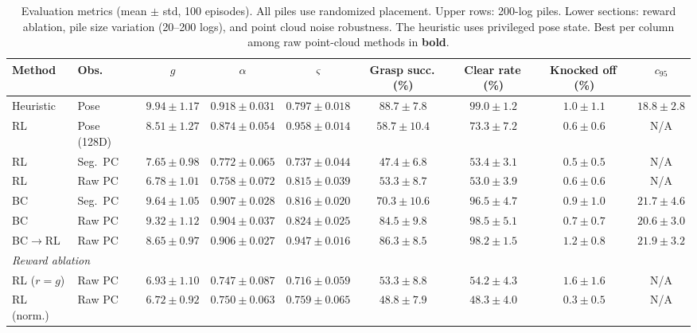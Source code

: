 \documentclass[letterpaper, 10 pt, conference]{ieeeconf}
\begin{document}
\begin{table}[!t]
\centering
\caption{Evaluation metrics (mean $\pm$ std, 100 episodes). All piles use randomized placement. Upper rows: 200-log piles. Lower sections: reward ablation, pile size variation (20--200 logs), and point cloud noise robustness. The heuristic uses privileged pose state. Best per column among raw point-cloud methods in \textbf{bold}.}
\label{tab:results}
\scriptsize
\setlength{\tabcolsep}{3pt}
\setlength{\aboverulesep}{0.2ex}
\setlength{\belowrulesep}{0.4ex}
\renewcommand{\arraystretch}{0.85}
\begin{tabular*}{\textwidth}{@{\extracolsep{\fill}}llccccccc@{}}
\toprule
Method & Obs. & $g$ & $\alpha$ & $\varsigma$ & Grasp succ.\,(\%) & Clear rate\,(\%) & Knocked off\,(\%) & $c_{95}$ \\
\midrule
Heuristic & Pose & $9.94 \pm 1.17$ & $0.918 \pm 0.031$ & $0.797 \pm 0.018$ & $88.7 \pm 7.8$ & $99.0 \pm 1.2$ & $1.0 \pm 1.1$ & $18.8 \pm 2.8$ \\
\addlinespace
RL & Pose (128D) & $8.51 \pm 1.27$ & $0.874 \pm 0.054$ & $0.958 \pm 0.014$ & $58.7 \pm 10.4$ & $73.3 \pm 7.2$ & $0.6 \pm 0.6$ & N/A \\
RL & Seg.\ PC   & $7.65 \pm 0.98$ & $0.772 \pm 0.065$ & $0.737 \pm 0.044$ & $47.4 \pm 6.8$ & $53.4 \pm 3.1$ & $0.5 \pm 0.5$ & N/A \\
RL & Raw PC     & $6.78 \pm 1.01$ & $0.758 \pm 0.072$ & $0.815 \pm 0.039$ & $53.3 \pm 8.7$ & $53.0 \pm 3.9$ & $\mathbf{0.6 \pm 0.6}$ & N/A \\
\addlinespace
BC & Seg.\ PC   & $9.64 \pm 1.05$ & $0.907 \pm 0.028$ & $0.816 \pm 0.020$ & $70.3 \pm 10.6$ & $96.5 \pm 4.7$ & $0.9 \pm 1.0$ & $21.7 \pm 4.6$ \\
BC & Raw PC     & $\mathbf{9.32 \pm 1.12}$ & $0.904 \pm 0.037$ & $0.824 \pm 0.025$ & $84.5 \pm 9.8$ & $\mathbf{98.5 \pm 5.1}$ & $0.7 \pm 0.7$ & $\mathbf{20.6 \pm 3.0}$ \\
\addlinespace
BC$\to$RL & Raw PC & $8.65 \pm 0.97$ & $\mathbf{0.906 \pm 0.027}$ & $\mathbf{0.947 \pm 0.016}$ & $\mathbf{86.3 \pm 8.5}$ & $98.2 \pm 1.5$ & $1.2 \pm 0.8$ & $21.9 \pm 3.2$ \\
\midrule
\multicolumn{9}{l}{\textit{Reward ablation}} \\
\midrule
RL ($r{=}g$) & Raw PC & $6.93 \pm 1.10$ & $0.747 \pm 0.087$ & $0.716 \pm 0.059$ & $53.3 \pm 8.8$ & $54.2 \pm 4.3$ & $1.6 \pm 1.6$ & N/A \\
RL (norm.)   & Raw PC & $6.72 \pm 0.92$ & $0.750 \pm 0.063$ & $0.759 \pm 0.065$ & $48.8 \pm 7.9$ & $48.3 \pm 4.0$ & $0.3 \pm 0.5$ & N/A \\

\end{tabular*}
\end{table}
\end{document}
